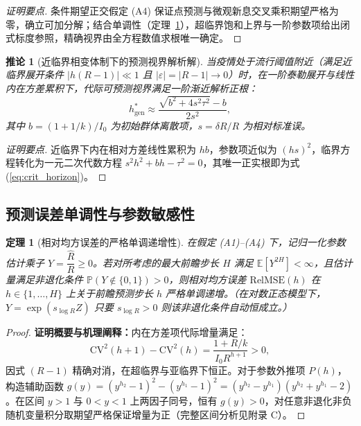 \documentclass[10pt,a4paper]{article}
\theoremstyle{plain}
\newtheorem{theorem}{定理}
\newtheorem{corollary}{推论}
\theoremstyle{definition}
\begin{document}
\begin{proof}[证明要点]
条件期望正交假定 (A4) 保证点预测与微观新息交叉乘积期望严格为零，确立可加分解；结合单调性（定理~\ref{thm:monotonicity}），超临界饱和上界与一阶参数项给出闭式标度参照，精确视界由全方程数值求根唯一确定。
\end{proof}

\begin{corollary}[近临界相变体制下的预测视界解析解]\label{cor:near_crit_horizon}
当疫情处于流行阈值附近（满足近临界展开条件 $|h(R - 1)| \ll 1$ 且 $|\varepsilon| = |R - 1| \to 0$）时，在一阶泰勒展开与线性内在方差累积下，代际可预测视界满足一阶渐近解析正根：
\begin{equation}
h^*_{\text{gen}} \approx \frac{\sqrt{b^2 + 4 s^2 \tau^2} - b}{2 s^2},
\label{eq:crit_horizon}
\end{equation}
其中 $b = (1+1/k)/I_0$ 为初始群体离散项，$s = \delta R / R$ 为相对标准误。
\end{corollary}

\begin{proof}[证明要点]
近临界下内在相对方差线性累积为 $hb$，参数项近似为 $(hs)^2$，临界方程转化为一元二次代数方程 $s^2 h^2 + bh - \tau^2 = 0$，其唯一正实根即为式 (\ref{eq:crit_horizon})。
\end{proof}

\subsection{预测误差单调性与参数敏感性}

\begin{theorem}[相对均方误差的严格单调递增性]\label{thm:monotonicity}
在假定 (A1)--(A4) 下，记归一化参数估计乘子 $Y = \dfrac{\hat{R}}{R} \ge 0$。若对所考虑的最大前瞻步长 $H$ 满足 $\mathbb{E}[Y^{2H}] < \infty$，且估计量满足非退化条件 $\mathbb{P}(Y \notin \{0, 1\}) > 0$，则相对均方误差 $\text{RelMSE}(h)$ 在 $h \in \{1, \dots, H\}$ 上关于前瞻预测步长 $h$ 严格单调递增。（在对数正态模型下，$Y = \exp(s_{\log R} Z)$ 只要 $s_{\log R} > 0$ 则该非退化条件自动恒成立。）
\end{theorem}

\begin{proof}
\textbf{证明概要与机理阐释：}内在方差项代际增量满足：
\begin{equation*}
\text{CV}^2(h+1) - \text{CV}^2(h) = \frac{1+R/k}{I_0 R^{h+1}} > 0,
\end{equation*}
因式 $(R-1)$ 精确对消，在超临界与亚临界下恒正。对于参数外推项 $P(h)$，构造辅助函数 $g(y) = (y^{h_2}-1)^2 - (y^{h_1}-1)^2 = (y^{h_2}-y^{h_1})(y^{h_2}+y^{h_1}-2)$。在区间 $y>1$ 与 $0<y<1$ 上两因子同号，恒有 $g(y) > 0$，对任意非退化非负随机变量积分取期望严格保证增量为正（完整区间分析见附录 C）。
\end{proof}
\end{document}
